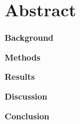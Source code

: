 \chapter*{Abstract}
\textbf{Background}

\textbf{Methods}

\textbf{Results}

\textbf{Discussion}

\textbf{Conclusion}